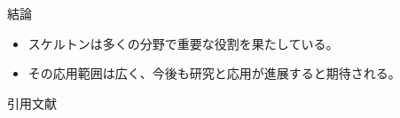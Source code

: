 \documentclass[aspectratio=169]{beamer}
\begin{document}
\begin{frame}{結論}
  \begin{itemize}
    \item スケルトンは多くの分野で重要な役割を果たしている。
    \item その応用範囲は広く、今後も研究と応用が進展すると期待される。
  \end{itemize}
\end{frame}

\begin{frame}{引用文献}
  \printbibliography{}
\end{frame}
\end{document}
